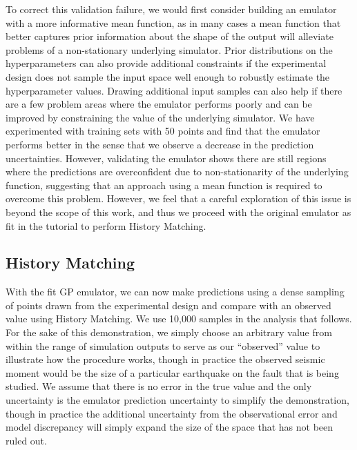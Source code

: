 \documentclass[openacc]{rstransa}%
\begin{document}
To correct this validation failure,
we would first consider building an emulator with
a more informative mean function, as in many cases a mean function that
better captures prior information about the shape of the output
will alleviate problems of a non-stationary
underlying simulator. Prior distributions on the hyperparameters can also
provide additional constraints if the experimental design does not sample
the input space well enough to robustly estimate
the hyperparameter values. Drawing
additional input samples can also help if there are a few problem areas
where the emulator performs poorly and can be improved by constraining
the value of the underlying simulator. We have experimented with training
sets with 50 points and find that the emulator performs better in the
sense that we observe a decrease in the prediction uncertainties.
However, validating the
emulator shows
there are still regions where the predictions are overconfident due to
non-stationarity of the underlying function, suggesting that an approach
using a mean function is required to overcome this problem. However, we
feel that a careful exploration of this issue is beyond the scope of this
work, and thus we
proceed with the original emulator as fit in the tutorial to perform
History Matching.

\subsection{History Matching}

With the fit GP emulator, we can now make predictions using a dense sampling of points drawn from the
experimental design and compare with an observed value using History Matching. We use 10,000 samples
in the analysis that follows. For the sake of this demonstration, we simply choose an arbitrary value
from within the range of simulation outputs to serve as our ``observed'' value to illustrate how the
procedure works, though in practice the observed seismic moment would be the size of a particular
earthquake on the fault that is being studied. We assume that there is no error in the true value
and the only uncertainty is the emulator prediction uncertainty to simplify the demonstration, though
in practice the additional uncertainty from the observational error and model discrepancy will simply
expand the size of the space that has not been ruled out.
\end{document}
